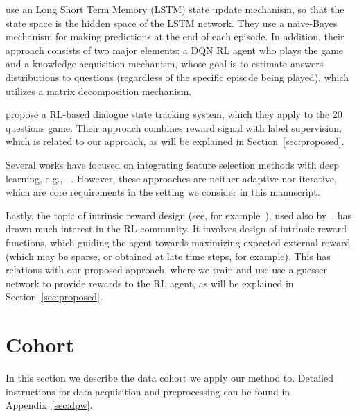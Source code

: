 \documentclass[reqno,11pt]{article}
\begin{document}
\citep{chen2018learning} use an Long Short Term Memory (LSTM) state update mechanism, so that the state space is the hidden space of the LSTM network. They use a naive-Bayes mechanism for making predictions at the end of each episode. 
In addition, their approach consists of two major elements: a DQN RL agent who plays the game and a knowledge acquisition mechanism, whose goal is to estimate answers distributions to questions (regardless of the specific episode being played), which utilizes a matrix decomposition mechanism.  

\citep{zhao2016towards} propose a RL-based dialogue state tracking system, which they apply to the 20 questions game. Their approach combines reward signal with label supervision, which is related to our approach, as will be explained in Section~\ref{sec:proposed}. 

Several works have focused on integrating feature selection methods with deep learning, e.g., ~\citep{li2016deep, roy2015feature, zhao2015heterogeneous, louizos2017learning, yamada2018deep, balin2019concrete}.
However, these approaches are neither adaptive nor iterative, which are core requirements in the setting we consider in this manuscript.

Lastly, the topic of intrinsic reward design (see, for example~\cite{zheng2018learning}), used also by~\citep{hu2018playing}, has drawn much interest in the RL community. It involves design of intrinsic reward functions, which guiding the agent towards maximizing expected external reward (which may be sparse, or obtained at late time steps, for example). 
This has relations with our proposed approach, where we train and use use a guesser network to provide rewards to the RL agent, as will be explained in Section~\ref{sec:proposed}.


\section {Cohort}\label{sec:cohort}
In this section we describe the data cohort we apply our method to. Detailed instructions for data acquisition and preprocessing can be found in Appendix~\ref{sec:dpw}.
\end{document}
